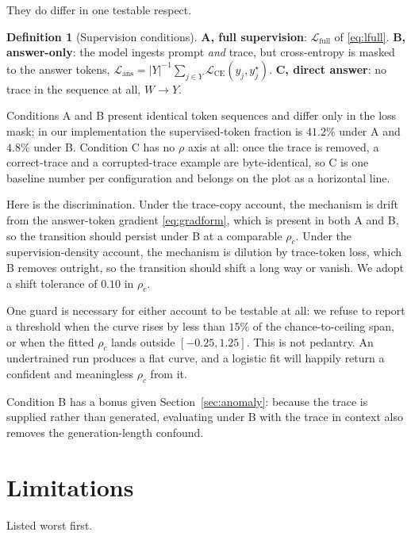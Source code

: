 \documentclass{article}
\theoremstyle{plain}
\theoremstyle{definition}
\newtheorem{definition}{Definition}
\theoremstyle{remark}
\newcommand{\1}{\mathbf{1}}
\newcommand{\cL}{\mathcal{L}}
\begin{document}
They do differ in one testable respect.

\begin{definition}[Supervision conditions]
\label{def:conditions}
\textbf{A, full supervision}: $\cL_{\mathrm{full}}$ of \eqref{eq:lfull}.
\textbf{B, answer-only}: the model ingests prompt \emph{and} trace, but
cross-entropy is masked to the answer tokens,
$\cL_{\mathrm{ans}} = |Y|^{-1}\sum_{j\in Y}\cL_{\mathrm{CE}}(y_j,y_j^\star)$.
\textbf{C, direct answer}: no trace in the sequence at all, $W\to Y$.
\end{definition}

Conditions A and B present identical token sequences and differ only in the loss
mask; in our implementation the supervised-token fraction is $41.2\%$ under A and
$4.8\%$ under B. Condition C has no $\rho$ axis at all: once the trace is
removed, a correct-trace and a corrupted-trace example are byte-identical, so C
is one baseline number per configuration and belongs on the plot as a horizontal
line.

Here is the discrimination. Under the trace-copy account, the mechanism is drift
from the answer-token gradient \eqref{eq:gradform}, which is present in both A
and B, so the transition should persist under B at a comparable $\rho_c$. Under
the supervision-density account, the mechanism is dilution by trace-token loss,
which B removes outright, so the transition should shift a long way or vanish. We
adopt a shift tolerance of $0.10$ in $\rho_c$.

One guard is necessary for either account to be testable at all: we refuse to
report a threshold when the curve rises by less than $15\%$ of the
chance-to-ceiling span, or when the fitted $\rho_c$ lands outside $[-0.25,1.25]$.
This is not pedantry. An undertrained run produces a flat curve, and a logistic
fit will happily return a confident and meaningless $\rho_c$ from it.

Condition B has a bonus given Section~\ref{sec:anomaly}: because the trace is
supplied rather than generated, evaluating under B with the trace in context also
removes the generation-length confound.

\section{Limitations}
\label{sec:limitations}

Listed worst first.
\end{document}
